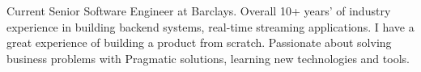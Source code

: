 

\begin{cvparagraph}

Current Senior Software Engineer at Barclays. Overall 10+ years' of industry experience in building backend systems, real-time streaming applications. I have a great experience of building a product from scratch. Passionate about solving business problems with Pragmatic solutions, learning new technologies and tools.
\end{cvparagraph}
